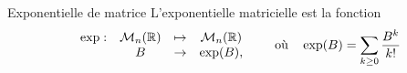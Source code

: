 \begin{definition}{Exponentielle de matrice}
  L'exponentielle matricielle est la fonction
  $$
  \begin{array}{rccc}
    \exp: & \mathcal{M}_n(\mathbb{R}) & \mapsto & \mathcal{M}_n(\mathbb{R}) \\
      & B & \to & \exp(B),
  \end{array}
  \qquad \text{où} \quad
  \exp(B) = \sum_{k \geq 0} \frac{B^k}{k !}
  $$
\end{definition}


